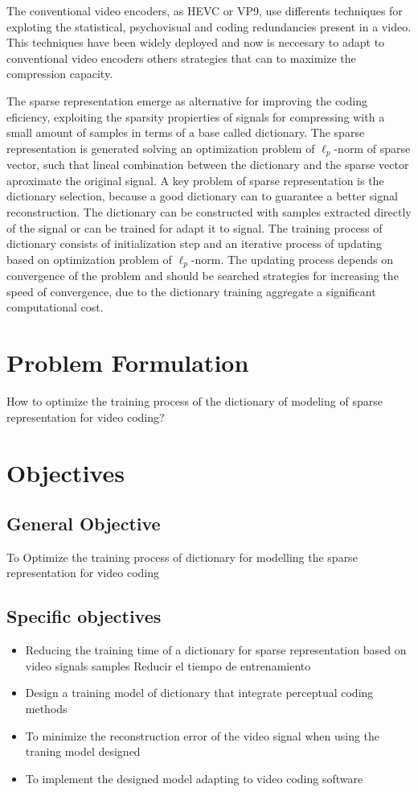 The conventional video encoders, as HEVC or VP9, use differents techniques for
exploting the statistical, psychovisual and coding redundancies present in a
video. This techniques have been widely deployed and now is neccesary to adapt
to conventional video encoders others strategies that can to maximize the
compression capacity. 

The sparse representation emerge as alternative for improving the coding
eficiency, exploiting the sparsity propierties of signals for compressing with a
small amount of samples in terms of a base called dictionary. The sparse
representation is generated solving an optimization problem of $\ell_p$-norm of
sparse vector, such that lineal combination between the dictionary and the
sparse vector aproximate the original signal. A key problem of sparse
representation is the dictionary selection, because a good dictionary can to
guarantee a better signal reconstruction. The dictionary can be constructed with
samples extracted directly of the signal or can be trained for adapt it to
signal. The training process of dictionary consists of initialization step and
an iterative process of updating based on optimization problem of $\ell_p$-norm.
The updating process depends on convergence of the problem and should be
searched strategies for increasing the speed of convergence, due to the
dictionary training aggregate a significant computational cost.



\section{Problem Formulation}
How to optimize the training process of the dictionary of modeling of sparse
representation for video coding?

\section{Objectives}
\subsection{General Objective}
To Optimize the training process of dictionary for modelling the sparse
representation for video coding

\subsection{Specific objectives}
\begin{itemize}
\item Reducing the training time of a dictionary for sparse
representation based on video signals samples Reducir el tiempo de entrenamiento
\item Design a training model of dictionary that integrate perceptual coding
methods
\item To minimize the reconstruction error of the video signal when
using the traning model designed
\item To implement the designed model adapting to video coding
software 
\end{itemize}

